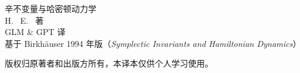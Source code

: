 \documentclass[UTF8,a4paper,zihao=-4,fontset=windows,oneside]{ctexbook}
\begin{document}
\begingroup{}
\begin{titlepage}
  \centering
  \vspace*{3cm}
  {\heiti 辛不变量与哈密顿动力学}\\[3cm]
  { H.~\trHofer{} \quad E.~\trZehnder{} 著}\\[0.6cm]
  { GLM \& GPT 译}\\[0.6cm]
  { 基于 Birkhäuser 1994 年版（\emph{Symplectic Invariants and
   Hamiltonian Dynamics}）}\\[4cm]
  \begin{minipage}{0.8\textwidth}\small
    版权归原著者和出版方所有，本译本仅供个人学习使用。
  \end{minipage}
  \vfill
\end{titlepage}
\endgroup

\frontmatter
\tableofcontents

\mainmatter
\BookIndexingtrue








\BookIndexingfalse
\backmatter


\printindex


\end{document}
